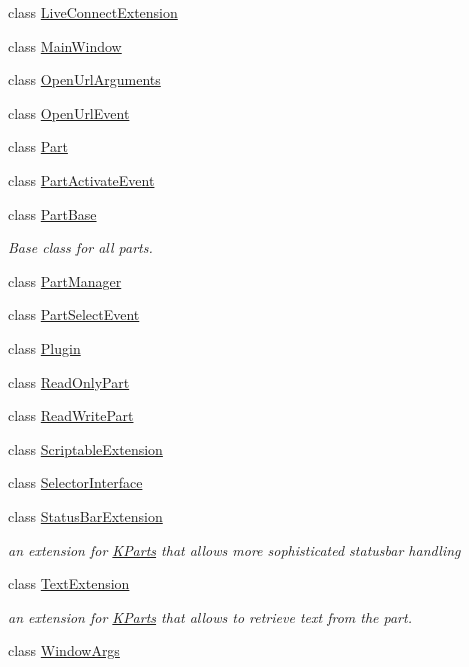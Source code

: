 \begin{DoxyCompactItemize}
class \hyperlink{classKParts_1_1LiveConnectExtension}{Live\+Connect\+Extension}
\item 
class \hyperlink{classKParts_1_1MainWindow}{Main\+Window}
\item 
class \hyperlink{classKParts_1_1OpenUrlArguments}{Open\+Url\+Arguments}
\item 
class \hyperlink{classKParts_1_1OpenUrlEvent}{Open\+Url\+Event}
\item 
class \hyperlink{classKParts_1_1Part}{Part}
\item 
class \hyperlink{classKParts_1_1PartActivateEvent}{Part\+Activate\+Event}
\item 
class \hyperlink{classKParts_1_1PartBase}{Part\+Base}
\begin{DoxyCompactList}\small\item\em Base class for all parts. \end{DoxyCompactList}\item 
class \hyperlink{classKParts_1_1PartManager}{Part\+Manager}
\item 
class \hyperlink{classKParts_1_1PartSelectEvent}{Part\+Select\+Event}
\item 
class \hyperlink{classKParts_1_1Plugin}{Plugin}
\item 
class \hyperlink{classKParts_1_1ReadOnlyPart}{Read\+Only\+Part}
\item 
class \hyperlink{classKParts_1_1ReadWritePart}{Read\+Write\+Part}
\item 
class \hyperlink{classKParts_1_1ScriptableExtension}{Scriptable\+Extension}
\item 
class \hyperlink{classKParts_1_1SelectorInterface}{Selector\+Interface}
\item 
class \hyperlink{classKParts_1_1StatusBarExtension}{Status\+Bar\+Extension}
\begin{DoxyCompactList}\small\item\em an extension for \hyperlink{namespaceKParts}{K\+Parts} that allows more sophisticated statusbar handling \end{DoxyCompactList}\item 
class \hyperlink{classKParts_1_1TextExtension}{Text\+Extension}
\begin{DoxyCompactList}\small\item\em an extension for \hyperlink{namespaceKParts}{K\+Parts} that allows to retrieve text from the part. \end{DoxyCompactList}\item 
class \hyperlink{classKParts_1_1WindowArgs}{Window\+Args}
\end{DoxyCompactItemize}
